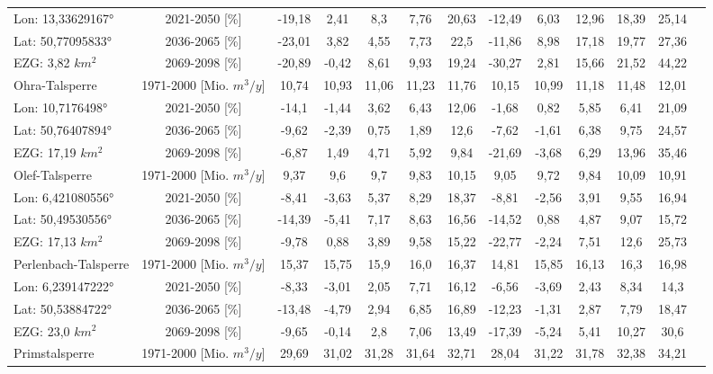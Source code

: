 \begin{longtable}{@{\extracolsep{\fill}}lc|ccccc||cccccc}
\cline{2-13} 
Lon: 13,33629167° & 2021-2050 [\%]  & -19,18 & 2,41 & 8,3 & 7,76 & 20,63 & -12,49 & 6,03 & 12,96 & 18,39 & 25,14 & \\ 
Lat: 50,77095833° & 2036-2065 [\%]  & -23,01 & 3,82 & 4,55 & 7,73 & 22,5 & -11,86 & 8,98 & 17,18 & 19,77 & 27,36 & \\ 
EZG: 3,82 $km^2$ & 2069-2098 [\%]  & -20,89 & -0,42 & 8,61 & 9,93 & 19,24 & -30,27 & 2,81 & 15,66 & 21,52 & 44,22 & \\ 
\hline 
Ohra-Talsperre & 1971-2000 [Mio. $m^3/y$]  & 10,74 & 10,93 & 11,06 & 11,23 & 11,76 & 10,15 & 10,99 & 11,18 & 11,48 & 12,01 & \\ 
\cline{2-13} 
Lon: 10,7176498° & 2021-2050 [\%]  & -14,1 & -1,44 & 3,62 & 6,43 & 12,06 & -1,68 & 0,82 & 5,85 & 6,41 & 21,09 & \\ 
Lat: 50,76407894° & 2036-2065 [\%]  & -9,62 & -2,39 & 0,75 & 1,89 & 12,6 & -7,62 & -1,61 & 6,38 & 9,75 & 24,57 & \\ 
EZG: 17,19 $km^2$ & 2069-2098 [\%]  & -6,87 & 1,49 & 4,71 & 5,92 & 9,84 & -21,69 & -3,68 & 6,29 & 13,96 & 35,46 & \\ 
\hline 
Olef-Talsperre & 1971-2000 [Mio. $m^3/y$]  & 9,37 & 9,6 & 9,7 & 9,83 & 10,15 & 9,05 & 9,72 & 9,84 & 10,09 & 10,91 & \\ 
\cline{2-13} 
Lon: 6,421080556° & 2021-2050 [\%]  & -8,41 & -3,63 & 5,37 & 8,29 & 18,37 & -8,81 & -2,56 & 3,91 & 9,55 & 16,94 & \\ 
Lat: 50,49530556° & 2036-2065 [\%]  & -14,39 & -5,41 & 7,17 & 8,63 & 16,56 & -14,52 & 0,88 & 4,87 & 9,07 & 15,72 & \\ 
EZG: 17,13 $km^2$ & 2069-2098 [\%]  & -9,78 & 0,88 & 3,89 & 9,58 & 15,22 & -22,77 & -2,24 & 7,51 & 12,6 & 25,73 & \\ 
\hline 
Perlenbach-Talsperre & 1971-2000 [Mio. $m^3/y$]  & 15,37 & 15,75 & 15,9 & 16,0 & 16,37 & 14,81 & 15,85 & 16,13 & 16,3 & 16,98 & \\ 
\cline{2-13} 
Lon: 6,239147222° & 2021-2050 [\%]  & -8,33 & -3,01 & 2,05 & 7,71 & 16,12 & -6,56 & -3,69 & 2,43 & 8,34 & 14,3 & \\ 
Lat: 50,53884722° & 2036-2065 [\%]  & -13,48 & -4,79 & 2,94 & 6,85 & 16,89 & -12,23 & -1,31 & 2,87 & 7,79 & 18,47 & \\ 
EZG: 23,0 $km^2$ & 2069-2098 [\%]  & -9,65 & -0,14 & 2,8 & 7,06 & 13,49 & -17,39 & -5,24 & 5,41 & 10,27 & 30,6 & \\ 
\hline 
Primstalsperre & 1971-2000 [Mio. $m^3/y$]  & 29,69 & 31,02 & 31,28 & 31,64 & 32,71 & 28,04 & 31,22 & 31,78 & 32,38 & 34,21 & \\ 

\end{longtable}
